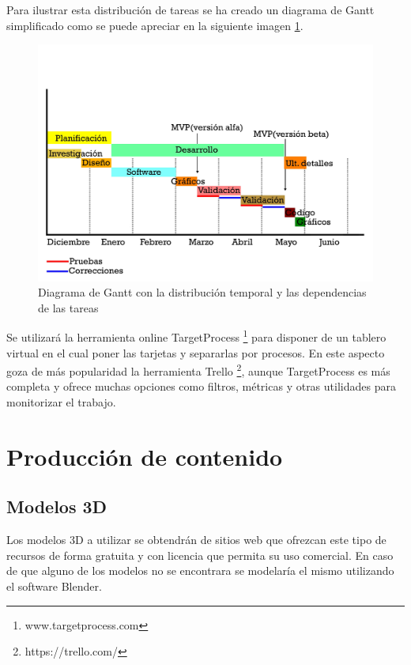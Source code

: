 Para ilustrar esta distribución de tareas se ha creado un diagrama de Gantt simplificado como se puede apreciar en la siguiente imagen \ref{gantt01}.

\begin{figure}
	\begin{center}
		\includegraphics[scale=0.6]{imagenes/GanttDiagram.jpg}
		\caption{Diagrama de Gantt con la distribución temporal y las dependencias de las tareas}
		\label{gantt01}
	\end{center}
\end{figure}

Se utilizará la herramienta online TargetProcess \footnote{www.targetprocess.com} para disponer de un tablero virtual  en el cual poner las tarjetas y separarlas por procesos. En este aspecto goza de más popularidad la herramienta Trello \footnote{https://trello.com/}, aunque TargetProcess es más completa y ofrece muchas opciones como filtros, métricas y otras utilidades para monitorizar el trabajo.

\section{Producción de contenido}
\subsection{Modelos 3D}
Los modelos 3D a utilizar se obtendrán de sitios web que ofrezcan este tipo de recursos de forma gratuita y con licencia que permita su uso comercial. En caso de que alguno de los modelos no se encontrara se modelaría el mismo utilizando el software Blender. 

